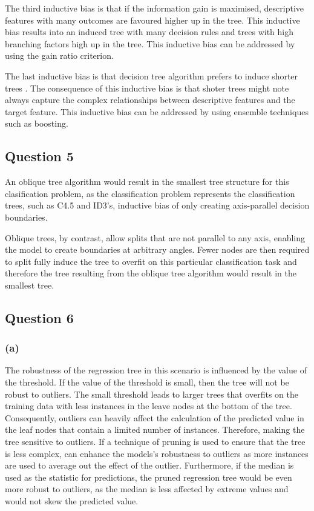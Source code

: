 \documentclass[10pt]{article}
\begin{document}
The third inductive bias is that if the information gain is maximised, descriptive features with many
outcomes are favoured higher up in the tree. This inductive bias results into an induced tree with many decision
rules and trees with high branching factors high up in the tree. This inductive bias can be addressed by using
the gain ratio criterion.

The last inductive bias is that decision tree algorithm prefers to induce shorter trees \cite{sectionB-Q4}. The consequence
of this inductive bias is that shoter trees might note always capture the complex relationships between
descriptive features and the target feature. This inductive bias can be addressed by using ensemble techniques
such as boosting.

\subsection*{Question 5}

An oblique tree algorithm would result in the smallest tree structure for this clasification problem,
as the classification problem represents the classification trees, such as C4.5 and ID3's, inductive bias
of only creating axis-parallel decision boundaries.

Oblique trees, by contrast, allow splits that are not parallel to any axis, enabling the model to create
boundaries at arbitrary angles. Fewer nodes are then required to split fully induce the tree to overfit
on this particular classification task and therefore the tree resulting from the oblique
tree algorithm would result in the smallest tree.

\subsection*{Question 6}

\subsubsection*{(a)}

The robustness of the regression tree in this scenario is influenced by the value of the threshold.
If the value of the threshold is small, then the tree will not be robust to outliers. The small threshold
leads to larger trees that overfits on the training data with less instances in the leave nodes at the bottom of the tree.
Consequently, outliers can heavily affect the calculation of the predicted value in the leaf nodes that
contain a limited number of instances. Therefore, making the tree sensitive to outliers. If a technique
of pruning is used to ensure that the tree is less complex, can enhance the models's robustness to outliers
as more instances are used to average out the effect of the outlier. Furthermore, if the median is used as the
statistic for predictions, the pruned regression tree would be even more robust to outliers, as the median is
less affected by extreme values and would not skew the predicted value.
\end{document}
